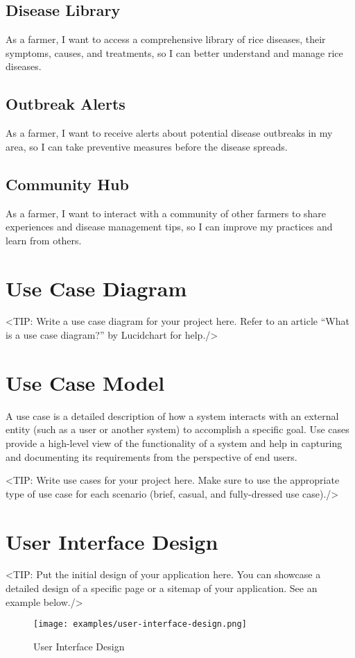 \subsection{Disease Library}
\label{subsection:disease-library}

As a farmer, I want to access a comprehensive library of rice diseases, their symptoms, causes, and treatments, so I can better understand and manage rice diseases.

\subsection{Outbreak Alerts}
\label{subsection:outbreak-alerts}

As a farmer, I want to receive alerts about potential disease outbreaks in my area, so I can take preventive measures before the disease spreads.

\subsection{Community Hub}
\label{subsection:community-hub}

As a farmer, I want to interact with a community of other farmers to share experiences and disease management tips, so I can improve my practices and learn from others.

\section{Use Case Diagram}
\label{section:use-case-diagram}
<TIP: Write a use case diagram for your project here. Refer to an
article “What is a use case diagram?” by Lucidchart for help./>

\section{Use Case Model}
\label{section:use-case-model}
A use case is a detailed description of how a system
interacts with an external entity (such as a user or another system) to
accomplish a specific goal. Use cases provide a high-level view of the
functionality of a system and help in capturing and documenting its
requirements from the perspective of end users.

<TIP: Write use cases for your project here. Make sure to use the
appropriate type of use case for each scenario (brief, casual, and fully-dressed
use case)./>

\section{User Interface Design}
\label{section:user-interface-design}
<TIP: Put the initial design of your application here. You can
showcase a detailed design of a specific page or a sitemap of your application.
See an example below./>

\begin{figure}[h]
    \centering
    \texttt{[image: examples/user-interface-design.png]}
    \caption{User Interface Design}
\end{figure}